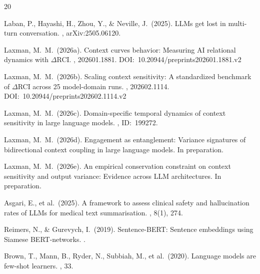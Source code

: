 \documentclass[11pt,a4paper]{article}
\begin{document}

\begin{thebibliography}{20}

Laban, P., Hayashi, H., Zhou, Y., \& Neville, J.\ (2025).
\newblock LLMs get lost in multi-turn conversation.
, arXiv:2505.06120.

Laxman, M.\ M.\ (2026a).
\newblock Context curves behavior: Measuring AI relational dynamics with $\Delta$RCI.
, 202601.1881. DOI:~10.20944/preprints202601.1881.v2

Laxman, M.\ M.\ (2026b).
\newblock Scaling context sensitivity: A standardized benchmark of $\Delta$RCI across 25 model-domain runs.
, 202602.1114. DOI:~10.20944/preprints202602.1114.v2

Laxman, M.\ M.\ (2026c).
\newblock Domain-specific temporal dynamics of context sensitivity in large language models.
, ID:~199272.

Laxman, M.\ M.\ (2026d).
\newblock Engagement as entanglement: Variance signatures of bidirectional context coupling in large language models.
\newblock In preparation.

Laxman, M.\ M.\ (2026e).
\newblock An empirical conservation constraint on context sensitivity and output variance:
Evidence across LLM architectures.
\newblock In preparation.

Asgari, E., et al.\ (2025).
\newblock A framework to assess clinical safety and hallucination rates of LLMs
for medical text summarisation.
, 8(1), 274.

Reimers, N., \& Gurevych, I.\ (2019).
\newblock Sentence-BERT: Sentence embeddings using Siamese BERT-networks.
.

Brown, T., Mann, B., Ryder, N., Subbiah, M., et al.\ (2020).
\newblock Language models are few-shot learners.
, 33.


\end{thebibliography}
\end{document}
